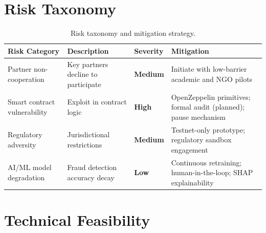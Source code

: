 \documentclass[12pt,a4paper]{report}
\newcommand{\tableheadfont}{\bfseries\small\color{PrimaryBlue}}
\newenvironment{moderntable}[1][H]{%
    \begin{table}[#1]\centering\small%
    \renewcommand{\arraystretch}{1.35}%
}{%
    \end{table}%
}
\begin{document}
\section{Risk Taxonomy}

\begin{moderntable}
\caption{Risk taxonomy and mitigation strategy.}
\begin{tabular}{@{} >{\raggedright}p{2.4cm} >{\raggedright}p{3.2cm} >{\centering\arraybackslash}p{1.8cm} >{\raggedright\arraybackslash}p{4.2cm} @{}}
\toprule
\tableheadfont Risk Category & \tableheadfont Description & \tableheadfont Severity & \tableheadfont Mitigation \\
\midrule
\rowcolor{RowShade}
Partner non-cooperation & Key partners decline to participate & {\color{AmberAccent}\textbf{Medium}} & Initiate with low-barrier academic and NGO pilots \\
Smart contract vulnerability & Exploit in contract logic & {\color{RedAccent}\textbf{High}} & OpenZeppelin primitives; formal audit (planned); pause mechanism \\
\rowcolor{RowShade}
Regulatory adversity & Jurisdictional restrictions & {\color{AmberAccent}\textbf{Medium}} & Testnet-only prototype; regulatory sandbox engagement \\
AI/ML model degradation & Fraud detection accuracy decay & {\color{GreenAccent}\textbf{Low}} & Continuous retraining; human-in-the-loop; SHAP explainability \\
\bottomrule
\end{tabular}
\end{moderntable}


\section{Technical Feasibility}
\end{document}
